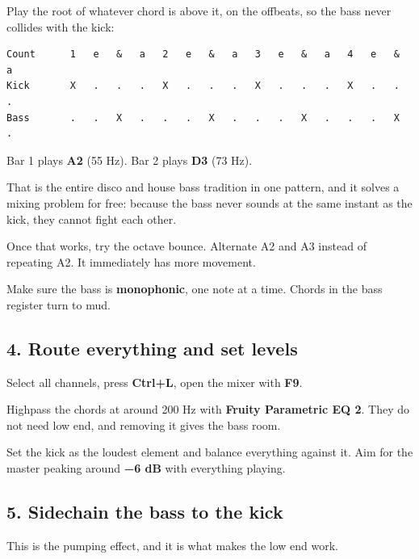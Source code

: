 Play the root of whatever chord is above it, on the offbeats, so the bass never collides with
the kick:

\begin{verbatim}
Count      1   e   &   a   2   e   &   a   3   e   &   a   4   e   &   a
Kick       X   .   .   .   X   .   .   .   X   .   .   .   X   .   .   .
Bass       .   .   X   .   .   .   X   .   .   .   X   .   .   .   X   .
\end{verbatim}

Bar 1 plays \textbf{A2} (55 Hz). Bar 2 plays \textbf{D3} (73 Hz).

That is the entire disco and house bass tradition in one pattern, and it solves a mixing
problem for free: because the bass never sounds at the same instant as the kick, they cannot
fight each other.

Once that works, try the octave bounce. Alternate A2 and A3 instead of repeating A2. It
immediately has more movement.

Make sure the bass is \textbf{monophonic}, one note at a time. Chords in the bass register turn to
mud.

\subsection{4. Route everything and set levels}\label{fl03_first_track-4-route-everything-and-set-levels}

Select all channels, press \textbf{Ctrl+L}, open the mixer with \textbf{F9}.

Highpass the chords at around 200 Hz with \textbf{Fruity Parametric EQ 2}. They do not need low
end, and removing it gives the bass room.

Set the kick as the loudest element and balance everything against it. Aim for the master
peaking around \textbf{−6 dB} with everything playing.

\subsection{5. Sidechain the bass to the kick}\label{fl03_first_track-5-sidechain-the-bass-to-the-kick}

This is the pumping effect, and it is what makes the low end work.

